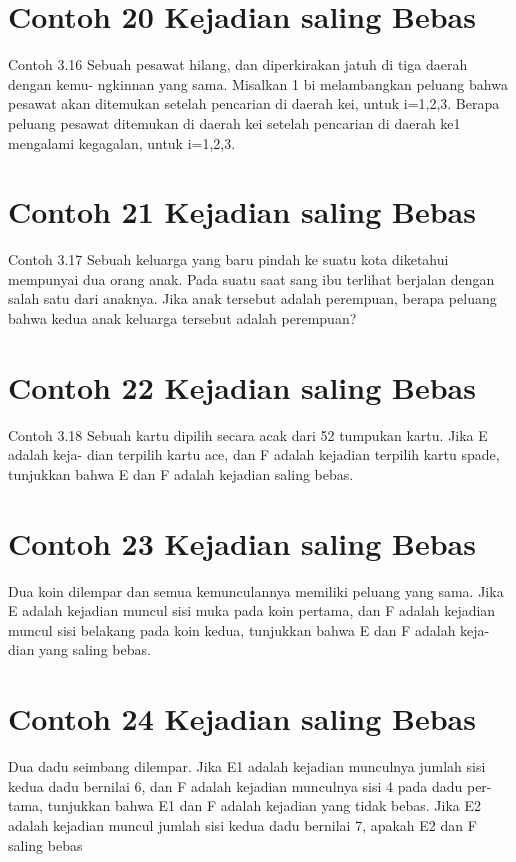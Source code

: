 \documentclass[11pt,fleqn]{book} %
\begin{document}
{{\vspace{0.5in}
\section{Contoh 20 Kejadian saling Bebas}

Contoh 3.16 Sebuah pesawat hilang, dan diperkirakan jatuh di tiga daerah dengan kemu- ngkinnan yang sama. Misalkan 1 bi melambangkan peluang bahwa pesawat akan ditemukan setelah pencarian di daerah kei, untuk i=1,2,3. Berapa peluang pesawat ditemukan di daerah kei setelah pencarian di daerah ke1 mengalami kegagalan, untuk i=1,2,3.

\vspace{0.5in}
\section{Contoh 21 Kejadian saling Bebas}

Contoh 3.17 Sebuah keluarga yang baru pindah ke suatu kota diketahui mempunyai dua orang anak. Pada suatu saat sang ibu terlihat berjalan dengan salah satu dari anaknya. Jika anak tersebut adalah perempuan, berapa peluang bahwa kedua anak keluarga tersebut adalah perempuan?

\vspace{0.5in}
\section{Contoh 22 Kejadian saling Bebas}

Contoh 3.18 Sebuah kartu dipilih secara acak dari 52 tumpukan kartu. Jika E adalah keja- dian terpilih kartu ace, dan F adalah kejadian terpilih kartu spade, tunjukkan bahwa E dan F adalah kejadian saling bebas.

\vspace{0.5in}
\section{Contoh 23 Kejadian saling Bebas}

Dua koin dilempar dan semua kemunculannya memiliki peluang yang sama. Jika E adalah kejadian muncul sisi muka pada koin pertama, dan F adalah kejadian muncul sisi belakang pada koin kedua, tunjukkan bahwa E dan F adalah keja- dian yang saling bebas.

\vspace{0.5in}
\section{Contoh 24 Kejadian saling Bebas}
Dua dadu seimbang dilempar. Jika E1 adalah kejadian munculnya jumlah sisi kedua dadu bernilai 6, dan F adalah kejadian munculnya sisi 4 pada dadu per- tama, tunjukkan bahwa E1 dan F adalah kejadian yang tidak bebas. Jika E2 adalah kejadian muncul jumlah sisi kedua dadu bernilai 7, apakah E2 dan F saling bebas
\vspace{0.5in}
}}
\end{document}
